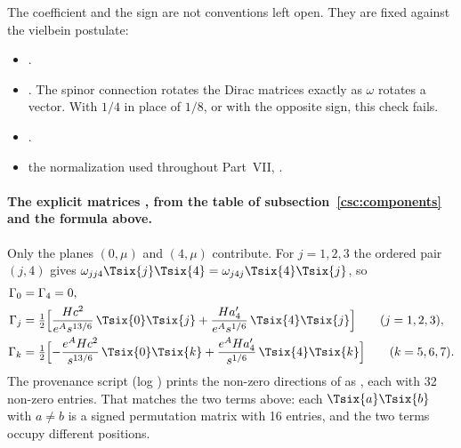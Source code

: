The coefficient and the sign are not conventions left open. They are fixed against the vielbein
postulate:
\begin{itemize}
  \item {} .
  \item {} .
    The spinor connection rotates the Dirac matrices exactly as $\omega$ rotates a vector. With
    $1/4$ in place of $1/8$, or with the opposite sign, this check fails.
  \item {} .
  \item {} the normalization used throughout Part~VII, .
\end{itemize}

\paragraph{The explicit matrices \cfderived, from the table of
subsection~\ref{csc:components} and the formula above.} Only the planes $(0,\mu)$ and $(4,\mu)$
contribute. For $j=1,2,3$ the ordered pair $(j,4)$ gives
$\omega_{jj4}\Tsix{j}\Tsix{4}=\omega_{j4j}\Tsix{4}\Tsix{j}$, so
\begin{equation}
\begin{aligned}
  \Gamma_0&=\Gamma_4=0,\\
  \Gamma_j&=\tfrac12\Bigl[\frac{Hc^2}{e^{A}s^{13/6}}\,\Tsix{0}\Tsix{j}+\frac{Ha_4'}{e^{A}s^{1/6}}\,\Tsix{4}\Tsix{j}\Bigr]\qquad(j=1,2,3),\\
  \Gamma_k&=\tfrac12\Bigl[-\frac{e^{A}Hc^2}{s^{13/6}}\,\Tsix{0}\Tsix{k}+\frac{e^{A}Ha_4'}{s^{1/6}}\,\Tsix{4}\Tsix{k}\Bigr]\qquad(k=5,6,7).
\end{aligned}
\end{equation}
The provenance script  (log
) prints the non-zero directions of  as
, each with 32 non-zero entries. That matches the two terms above: each
$\Tsix{a}\Tsix{b}$ with $a\neq b$ is a signed permutation matrix with 16 entries, and the two terms
occupy different positions.

